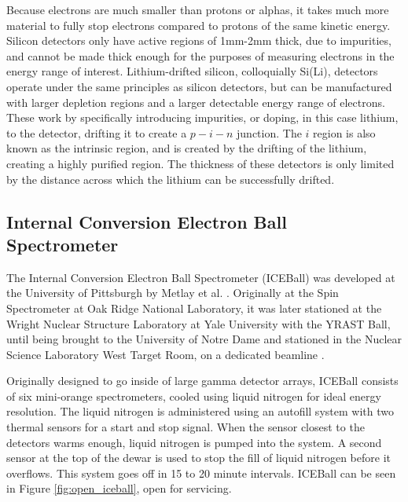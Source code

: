 

Because electrons are much smaller than protons or alphas, it takes much more material to fully stop electrons compared to protons of the same kinetic energy. Silicon detectors only have active regions of 1mm-2mm thick, due to impurities, and cannot be made thick enough for the purposes of measuring electrons in the energy range of interest. Lithium-drifted silicon, colloquially Si(Li), detectors operate under the same principles as silicon detectors, but can be manufactured with larger depletion regions and a larger detectable energy range of electrons. These work by specifically introducing impurities, or doping, in this case lithium, to the detector, drifting it to create a $p-i-n$ junction. The $i$ region is also known as the intrinsic region, and is created by the drifting of the lithium, creating a highly purified region. The thickness of these detectors is only limited by the distance across which the lithium can be successfully drifted.

\subsection{Internal Conversion Electron Ball Spectrometer}

The Internal Conversion Electron Ball Spectrometer (ICEBall) was developed at the University of Pittsburgh by Metlay et al. \citep{metlay92:_iceball_comm,metlay93:_iceball_comm}. Originally at the Spin Spectrometer at Oak Ridge National Laboratory, it was later stationed at the Wright Nuclear Structure Laboratory at Yale University with the YRAST Ball, until being brought to the University of Notre Dame and stationed in the Nuclear Science Laboratory West Target Room, on a dedicated beamline \citep{battaglia15:_iceball_176lu}.

Originally designed to go inside of large gamma detector arrays, ICEBall consists of six mini-orange spectrometers, cooled using liquid nitrogen for ideal energy resolution. The liquid nitrogen is administered using an autofill system with two thermal sensors for a start and stop signal. When the sensor closest to the detectors warms enough, liquid nitrogen is pumped into the system. A second sensor at the top of the dewar is used to stop the fill of liquid nitrogen before it overflows. This system goes off in 15 to 20 minute intervals. ICEBall can be seen in Figure \ref{fig:open_iceball}, open for servicing.



